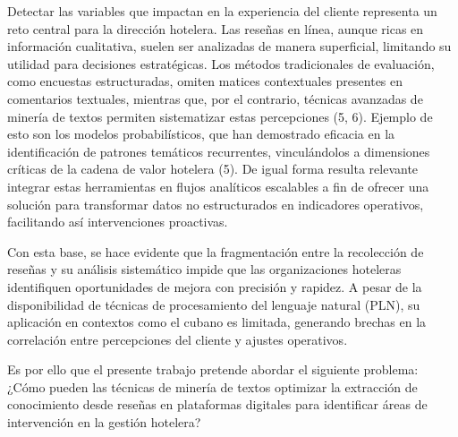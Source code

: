 	Detectar las variables que impactan en la experiencia del cliente representa un reto central para la dirección hotelera. Las reseñas en línea, aunque ricas en información cualitativa, suelen ser analizadas de manera superficial, limitando su utilidad para decisiones estratégicas. Los métodos tradicionales de evaluación, como encuestas estructuradas, omiten matices contextuales presentes en comentarios textuales, mientras que, por el contrario, técnicas avanzadas de minería de textos permiten sistematizar estas percepciones (5, 6). Ejemplo de esto son los modelos probabilísticos, que han demostrado eficacia en la identificación de patrones temáticos recurrentes, vinculándolos a dimensiones críticas de la cadena de valor hotelera (5). De igual forma resulta relevante integrar estas herramientas en flujos analíticos escalables a fin de ofrecer una solución para transformar datos no estructurados en indicadores operativos, facilitando así intervenciones proactivas.
	
	Con esta base, se hace evidente que la fragmentación entre la recolección de reseñas y su análisis sistemático impide que las organizaciones hoteleras identifiquen oportunidades de mejora con precisión y rapidez. A pesar de la disponibilidad de técnicas de procesamiento del lenguaje natural (PLN), su aplicación en contextos como el cubano es limitada, generando brechas en la correlación entre percepciones del cliente y ajustes operativos.
	
	Es por ello que el presente trabajo pretende abordar el siguiente problema: 
	¿Cómo pueden las técnicas de minería de textos optimizar la extracción de conocimiento desde reseñas en plataformas digitales para identificar áreas de intervención en la gestión hotelera?
	
